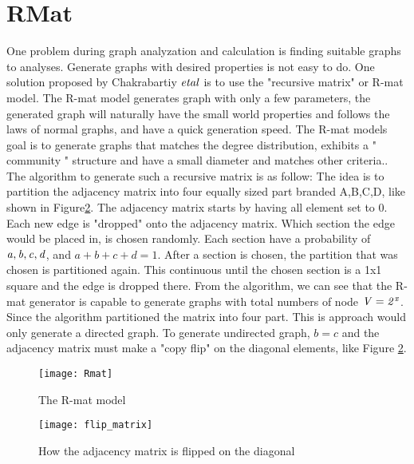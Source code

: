 {\section{RMat}
One problem during graph analyzation and calculation is finding suitable graphs to analyses. Generate graphs with desired properties is not easy to do. One solution proposed by Chakrabartiy $\it{et al}$ is to use the "recursive matrix" or R-mat model. The R-mat model generates graph with only a few parameters, the generated graph will naturally have the small world properties and follows the laws of normal graphs, and have a quick generation speed\cite{Rmat2004}. The R-mat models goal is to generate graphs that matches the degree distribution, exhibits a " community " structure and have a small diameter and matches other criteria.\cite{Rmat2004}. The algorithm to generate such a recursive matrix is as follow: The idea is to partition the adjacency matrix into four equally sized part branded A,B,C,D, like shown in Figure\ref{fig:flipDiagonal}. The adjacency matrix starts by having all element set to 0. Each new edge is "dropped" onto the adjacency matrix. Which section the edge would be placed in, is chosen randomly. Each section have a probability of $\it{a, b, c, d}$, and $a + b + c + d = 1$. After a section is chosen, the partition that was chosen is partitioned again. This continuous until the chosen section is a 1x1 square and the edge is dropped there. From the algorithm, we can see that the R-mat generator is capable to generate graphs with total numbers of node $ \it{V} = 2^x$. Since the algorithm partitioned the matrix into four part. This is approach would only generate a directed graph. To generate undirected graph, $b = c$ and the adjacency matrix must make a "copy flip" on the diagonal elements, like Figure \ref{fig:flipDiagonal}. 


\begin{figure}
\texttt{[image: Rmat]}
\caption{The R-mat model}
\label{fig:Rmat}
\end{figure}

\begin{figure}
\texttt{[image: flip\_matrix]}
\caption{How the adjacency matrix is flipped on the diagonal}
\label{fig:flipDiagonal}

\end{figure}



}

